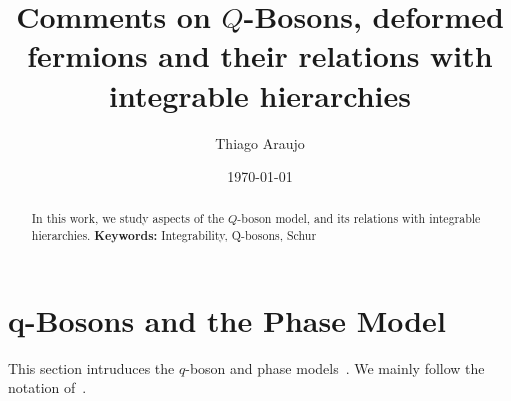 \documentclass[a4paper,11pt]{amsart}
\begin{document}

\title{Comments on \(Q\)-Bosons, deformed fermions and their relations
    with integrable hierarchies}

\author{Thiago Araujo}

\address{\noindent 
Instituto de Fíısica Teórica, UNESP-Universidade Estadual Paulista
R. Dr. Bento T. Ferraz 271, Bl. II, Sao Paulo 01140-070, SP, Brazil\\
and
Instituto de Física\\ Universidade de S\~ao Paulo\\ 
Rua do Matão Travessa 1371, 05508-090\\ São Paulo, SP. Brazil
}


\date{\today}

\begin{abstract}
  In this work, we study aspects of the \(Q\)-boson model, and 
its relations with integrable hierarchies. 
 \noindent \textbf{Keywords:} Integrability, Q-bosons, Schur
\end{abstract}

\maketitle

\setcounter{tocdepth}{1}
\tableofcontents

\section{q-Bosons and the Phase Model}

This section intruduces the \(q\)-boson and phase
models~\cite{Bogoliubov:1992, Bogoliubov:1997soj, Bogoliubov2005,
  Bogoliubov:1997soj, Tsilevich:2006}. We mainly follow the notation
of~\cite{Wheeler:2010vmq}.
\end{document}
